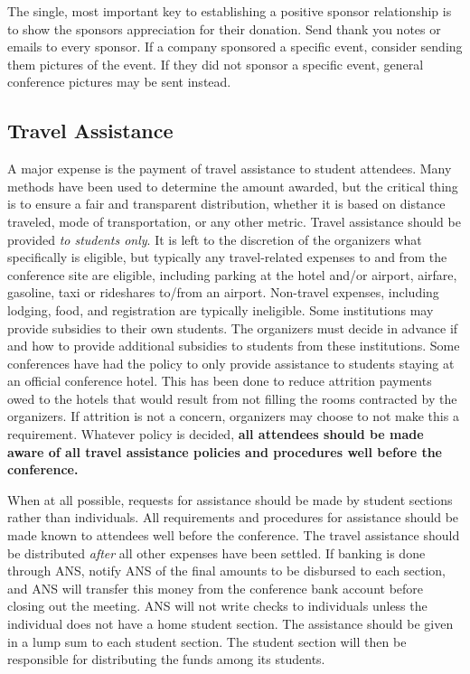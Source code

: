 \documentclass[12pt]{article}
\begin{document}
The single, most important key to establishing a positive sponsor relationship is to show the sponsors appreciation for their donation.
Send thank you notes or emails to every sponsor.
If a company sponsored a specific event, consider sending them pictures of the event.
If they did not sponsor a specific event, general conference pictures may be sent instead.

\subsection{Travel Assistance}
A major expense is the payment of travel assistance to student attendees.
Many methods have been used to determine the amount awarded, but the critical thing is to ensure a fair and transparent distribution, whether it is based on distance traveled, mode of transportation, or any other metric.
Travel assistance should be provided \emph{to students only}.
It is left to the discretion of the organizers what specifically is eligible, but typically any travel-related expenses to and from the conference site are eligible, including parking at the hotel and/or airport, airfare, gasoline, taxi or rideshares to/from an airport.
Non-travel expenses, including lodging, food, and registration are typically  ineligible.
Some institutions may provide subsidies to their own students.
The organizers must decide in advance if and how to provide additional subsidies to students from these institutions.
Some conferences have had the policy to only provide assistance to students staying at an official conference hotel.
This has been done to reduce attrition payments owed to the hotels that would result from not filling the rooms contracted by the organizers.
If attrition is not a concern, organizers may choose to not make this a requirement.
Whatever policy is decided, \textbf{all attendees should be made aware of all travel assistance policies and procedures well before the conference.}

When at all possible, requests for assistance should be made by student sections rather than individuals. 
All requirements and procedures for assistance should be made known to attendees well before the conference.
The travel assistance should be distributed \emph{after} all other expenses have been settled.
If banking is done through ANS, notify ANS of the final amounts to be disbursed to each section, and ANS will transfer this money from the conference bank account before closing out the meeting.
ANS will not write checks to individuals unless the individual does not have a home student section.
The assistance should be given in a lump sum to each student section.
The student section will then be responsible for distributing the funds among its students.
\end{document}
